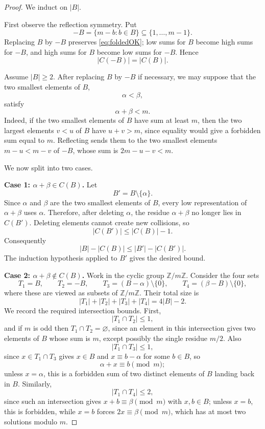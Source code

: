 \documentclass[11pt]{amsart}
\theoremstyle{definition}
\newcommand{\Z}{\mathbb{Z}}
\begin{document}
\begin{proof}
We induct on $|B|$.

First observe the reflection symmetry. Put
\[
  -B=\{m-b:b\in B\}\subseteq \{1,\ldots,m-1\}.
\]
Replacing $B$ by $-B$ preserves \eqref{eq:foldedOK}; low sums for $B$ become high sums for $-B$, and high sums for $B$ become low sums for $-B$. Hence
\begin{equation}\label{eq:collision-reflection}
  |C(-B)|=|C(B)|.
\end{equation}

Assume $|B|\geq 2$. After replacing $B$ by $-B$ if necessary, we may suppose that the two smallest elements of $B$,
\[
  \alpha<\beta,
\]
satisfy
\begin{equation}\label{eq:small-sum}
  \alpha+\beta<m.
\end{equation}
Indeed, if the two smallest elements of $B$ have sum at least $m$, then the two largest elements $v<u$ of $B$ have $u+v>m$, since equality would give a forbidden sum equal to $m$. Reflecting sends them to the two smallest elements $m-u<m-v$ of $-B$, whose sum is $2m-u-v<m$.

We now split into two cases.

\smallskip
\noindent\textbf{Case 1: $\alpha+\beta\in C(B)$.}
Let
\[
  B'=B\setminus\{\alpha\}.
\]
Since $\alpha$ and $\beta$ are the two smallest elements of $B$, every low representation of $\alpha+\beta$ uses $\alpha$. Therefore, after deleting $\alpha$, the residue $\alpha+\beta$ no longer lies in $C(B')$. Deleting elements cannot create new collisions, so
\[
  |C(B')|\leq |C(B)|-1.
\]
Consequently
\[
  |B|-|C(B)|\leq |B'|-|C(B')|.
\]
The induction hypothesis applied to $B'$ gives the desired bound.

\smallskip
\noindent\textbf{Case 2: $\alpha+\beta\notin C(B)$.}
Work in the cyclic group $\Z/m\Z$. Consider the four sets
\[
  T_1=B,
  \qquad
  T_2=-B,
  \qquad
  T_3=(B-\alpha)\setminus\{0\},
  \qquad
  T_4=(\beta-B)\setminus\{0\},
\]
where these are viewed as subsets of $\Z/m\Z$. Their total size is
\begin{equation}\label{eq:four-total}
  |T_1|+|T_2|+|T_3|+|T_4|=4|B|-2.
\end{equation}
We record the required intersection bounds. First,
\[
  |T_1\cap T_2|\leq 1,
\]
and if $m$ is odd then $T_1\cap T_2=\varnothing$, since an element in this intersection gives two elements of $B$ whose sum is $m$, except possibly the single residue $m/2$. Also
\[
  |T_1\cap T_3|\leq 1,
\]
since $x\in T_1\cap T_3$ gives $x\in B$ and $x\equiv b-\alpha$ for some $b\in B$, so
\[
  \alpha+x\equiv b\pmod m;
\]
unless $x=\alpha$, this is a forbidden sum of two distinct elements of $B$ landing back in $B$. Similarly,
\[
  |T_1\cap T_4|\leq 2,
\]
since such an intersection gives $x+b\equiv \beta\pmod m$ with $x,b\in B$; unless $x=b$, this is forbidden, while $x=b$ forces $2x\equiv \beta\pmod m$, which has at most two solutions modulo $m$.


\end{proof}
\end{document}
